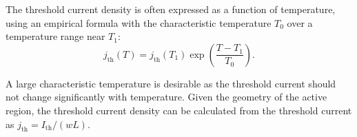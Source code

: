 The threshold current density is often expressed as a function of temperature,
using an empirical formula with the characteristic temperature $T_{0}$ over a
temperature range near $T_{1}$:
\begin{equation}
	j_{\mathrm{th}}(T)=j_{\mathrm{th}}(T_{1}) \exp\left(\frac{T-T_{1}}{T_{0}}\right
	).
	\label{eq:current_temperature}
\end{equation}

A large characteristic temperature is desirable as the threshold current should not
change significantly with temperature. Given the geometry of the active region,
the threshold current density can be calculated from the threshold current as $j_{\mathrm{th}}
=I_{\mathrm{th}}/(wL)$.
